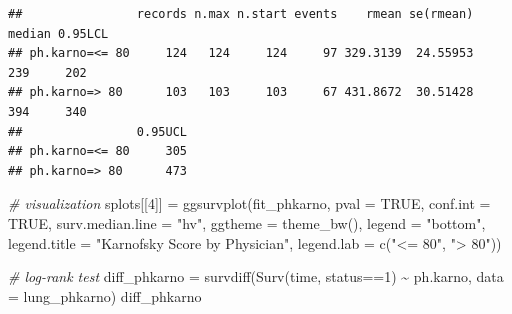 \documentclass[
]{article}
\newenvironment{Shaded}{\begin{snugshade}}{\end{snugshade}}
\newcommand{\AttributeTok}[1]{\textcolor[rgb]{0.77,0.63,0.00}{#1}}
\newcommand{\CommentTok}[1]{\textcolor[rgb]{0.56,0.35,0.01}{\textit{#1}}}
\newcommand{\ConstantTok}[1]{\textcolor[rgb]{0.00,0.00,0.00}{#1}}
\newcommand{\DecValTok}[1]{\textcolor[rgb]{0.00,0.00,0.81}{#1}}
\newcommand{\FunctionTok}[1]{\textcolor[rgb]{0.00,0.00,0.00}{#1}}
\newcommand{\NormalTok}[1]{#1}
\newcommand{\OtherTok}[1]{\textcolor[rgb]{0.56,0.35,0.01}{#1}}
\newcommand{\SpecialCharTok}[1]{\textcolor[rgb]{0.00,0.00,0.00}{#1}}
\newcommand{\StringTok}[1]{\textcolor[rgb]{0.31,0.60,0.02}{#1}}
\begin{document}
\begin{Shaded}
\end{Shaded}

\begin{verbatim}
##                records n.max n.start events    rmean se(rmean) median 0.95LCL
## ph.karno=<= 80     124   124     124     97 329.3139  24.55953    239     202
## ph.karno=> 80      103   103     103     67 431.8672  30.51428    394     340
##                0.95UCL
## ph.karno=<= 80     305
## ph.karno=> 80      473
\end{verbatim}

\begin{Shaded}
\begin{Highlighting}[]
\CommentTok{\# visualization}
\NormalTok{splots[[}\DecValTok{4}\NormalTok{]] }\OtherTok{=} \FunctionTok{ggsurvplot}\NormalTok{(fit\_phkarno,}
                         \AttributeTok{pval =} \ConstantTok{TRUE}\NormalTok{, }\AttributeTok{conf.int =} \ConstantTok{TRUE}\NormalTok{,}
                         \AttributeTok{surv.median.line =} \StringTok{"hv"}\NormalTok{, }
                         \AttributeTok{ggtheme =} \FunctionTok{theme\_bw}\NormalTok{(), }
                         \AttributeTok{legend =} \StringTok{"bottom"}\NormalTok{, }
                         \AttributeTok{legend.title =} \StringTok{"Karnofsky Score by Physician"}\NormalTok{,}
                         \AttributeTok{legend.lab =} \FunctionTok{c}\NormalTok{(}\StringTok{"\textless{}= 80"}\NormalTok{, }\StringTok{"\textgreater{} 80"}\NormalTok{))}

\CommentTok{\# log{-}rank test}
\NormalTok{diff\_phkarno }\OtherTok{=} \FunctionTok{survdiff}\NormalTok{(}\FunctionTok{Surv}\NormalTok{(time, status}\SpecialCharTok{==}\DecValTok{1}\NormalTok{) }\SpecialCharTok{\textasciitilde{}}\NormalTok{ ph.karno, }\AttributeTok{data =}\NormalTok{ lung\_phkarno) }
\NormalTok{diff\_phkarno}
\end{Highlighting}
\end{Shaded}
\end{document}
